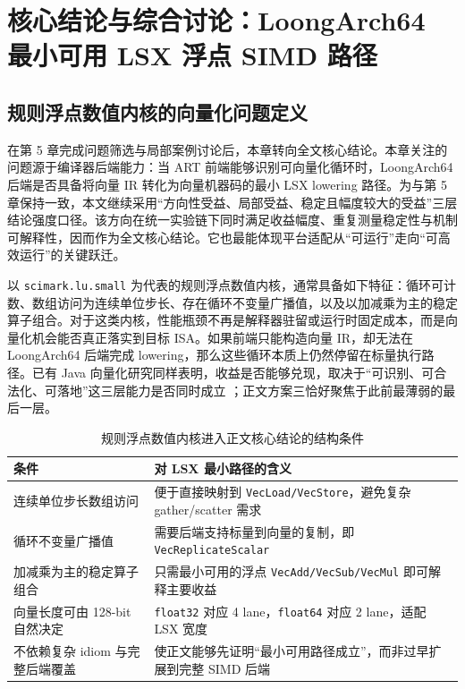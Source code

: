 \chapter{核心结论与综合讨论：LoongArch64 最小可用 LSX 浮点 SIMD 路径}\label{chap:simd}

\section{规则浮点数值内核的向量化问题定义}

在第 5 章完成问题筛选与局部案例讨论后，本章转向全文核心结论。本章关注的问题源于编译器后端能力：当 ART 前端能够识别可向量化循环时，LoongArch64 后端是否具备将向量 IR 转化为向量机器码的最小 LSX lowering 路径。为与第 5 章保持一致，本文继续采用“方向性受益、局部受益、稳定且幅度较大的受益”三层结论强度口径。该方向在统一实验链下同时满足收益幅度、重复测量稳定性与机制可解释性，因而作为全文核心结论。它也最能体现平台适配从“可运行”走向“可高效运行”的关键跃迁。

以 \texttt{scimark.lu.small} 为代表的规则浮点数值内核，通常具备如下特征：循环可计数、数组访问为连续单位步长、存在循环不变量广播值，以及以加减乘为主的稳定算子组合。对于这类内核，性能瓶颈不再是解释器驻留或运行时固定成本，而是向量化机会能否真正落实到目标 ISA。如果前端只能构造向量 IR，却无法在 LoongArch64 后端完成 lowering，那么这些循环本质上仍然停留在标量执行路径。已有 Java 向量化研究同样表明，收益是否能够兑现，取决于“可识别、可合法化、可落地”这三层能力是否同时成立 \citep{Nie2010VectorizationJava}；正文方案三恰好聚焦于此前最薄弱的最后一层。

\begin{table}[htbp]
    \centering
    \small
    \caption{规则浮点数值内核进入正文核心结论的结构条件}
    \label{tab:simd-kernel-features}
    \begin{tabular}{p{3.0cm}p{7.6cm}}
        \toprule
        \textbf{条件} & \textbf{对 LSX 最小路径的含义} \\
        \midrule
        连续单位步长数组访问 & 便于直接映射到 \texttt{VecLoad/VecStore}，避免复杂 gather/scatter 需求 \\
        循环不变量广播值 & 需要后端支持标量到向量的复制，即 \texttt{VecReplicateScalar} \\
        加减乘为主的稳定算子组合 & 只需最小可用的浮点 \texttt{VecAdd/VecSub/VecMul} 即可解释主要收益 \\
        向量长度可由 128-bit 自然决定 & \texttt{float32} 对应 4 lane，\texttt{float64} 对应 2 lane，适配 LSX 宽度 \\
        不依赖复杂 idiom 与完整后端覆盖 & 使正文能够先证明“最小可用路径成立”，而非过早扩展到完整 SIMD 后端 \\
        \bottomrule
    \end{tabular}
\end{table}

